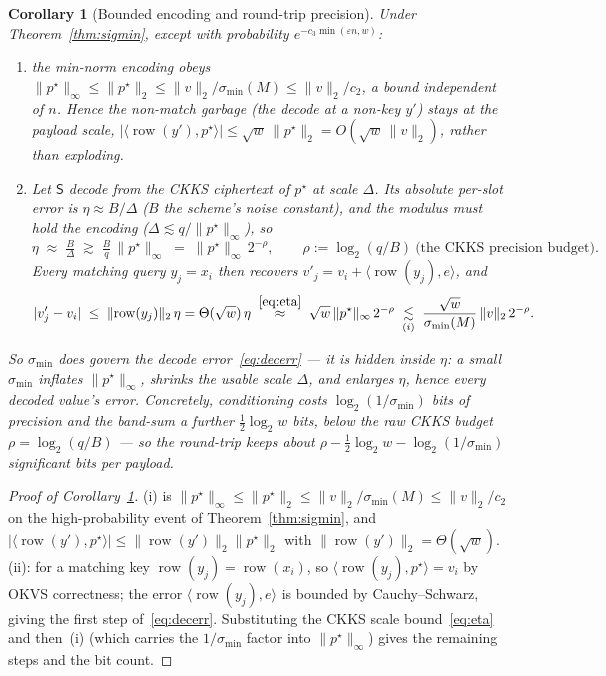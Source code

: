 \documentclass[11pt]{article}
\newcommand{\Snd}{\mathsf{S}}
\newcommand{\norm}[1]{\lVert #1 \rVert}
\newcommand{\sigmin}{\sigma_{\min}}
\DeclareMathOperator{\row}{row}
\theoremstyle{plain}
\newtheorem{corollary}{Corollary}
\theoremstyle{definition}
\begin{document}
\begin{corollary}[Bounded encoding and round-trip precision]\label{cor:precision}
Under Theorem~\ref{thm:sigmin}, except with probability $e^{-c_3\min(\varepsilon n,w)}$:
\begin{enumerate}[label=(\roman*),leftmargin=*,topsep=2pt]
  \item the min-norm encoding obeys
  $\norm{p^\star}_\infty\le\norm{p^\star}_2\le \norm{v}_2/\sigmin(M)\le\norm{v}_2/c_2$, a bound
  independent of $n$. Hence the non-match \emph{garbage} (the decode at a non-key $y'$) stays at
  the payload scale, $|\langle\row(y'),p^\star\rangle|\le\sqrt w\,\norm{p^\star}_2=O(\sqrt w\,\norm v_2)$,
  rather than exploding.
  \item Let $\Snd$ decode from the CKKS ciphertext of $p^\star$ at scale $\Delta$. Its absolute
  per-slot error is $\eta\approx B/\Delta$ ($B$ the scheme's noise constant), and the modulus
  must hold the encoding ($\Delta\lesssim q/\norm{p^\star}_\infty$), so
  \begin{equation}\label{eq:eta}
     \eta\;\approx\;\tfrac{B}{\Delta}\;\gtrsim\;\tfrac{B}{q}\,\norm{p^\star}_\infty
        \;=\;\norm{p^\star}_\infty\,2^{-\rho},\qquad \rho:=\log_2(q/B)\ \text{(the CKKS precision budget)} .
  \end{equation}
  Every matching query $y_j=x_i$ then recovers $v'_j=v_i+\langle\row(y_j),e\rangle$, and
  \begin{equation}\label{eq:decerr}
     |v'_j-v_i|\;\le\;\norm{\row(y_j)}_2\,\eta=\Theta(\sqrt w)\,\eta
       \;\overset{\eqref{eq:eta}}{\approx}\;\sqrt w\,\norm{p^\star}_\infty\,2^{-\rho}
       \;\underset{(i)}{\lesssim}\;\frac{\sqrt w}{\sigmin(M)}\,\norm{v}_2\,2^{-\rho} .
  \end{equation}
\end{enumerate}
So $\sigmin$ \emph{does} govern the decode error~\eqref{eq:decerr} --- it is hidden inside
$\eta$: a small $\sigmin$ inflates $\norm{p^\star}_\infty$, shrinks the usable scale $\Delta$,
and enlarges $\eta$, hence every decoded value's error. Concretely, conditioning costs
$\log_2(1/\sigmin)$ bits of precision and the band-sum a further $\tfrac12\log_2 w$ bits, below
the raw CKKS budget $\rho=\log_2(q/B)$ --- so the round-trip keeps about
$\rho-\tfrac12\log_2 w-\log_2(1/\sigmin)$ significant bits per payload.
\end{corollary}

\begin{proof}[Proof of Corollary~\ref{cor:precision}]
(i) is $\norm{p^\star}_\infty\le\norm{p^\star}_2\le\norm v_2/\sigmin(M)\le\norm v_2/c_2$ on the
high-probability event of Theorem~\ref{thm:sigmin}, and
$|\langle\row(y'),p^\star\rangle|\le\norm{\row(y')}_2\norm{p^\star}_2$ with
$\norm{\row(y')}_2=\Theta(\sqrt w)$. (ii): for a matching key $\row(y_j)=\row(x_i)$, so
$\langle\row(y_j),p^\star\rangle=v_i$ by OKVS correctness; the error $\langle\row(y_j),e\rangle$
is bounded by Cauchy--Schwarz, giving the first step of~\eqref{eq:decerr}. Substituting the
CKKS scale bound~\eqref{eq:eta} and then~(i) (which carries the $1/\sigmin$ factor into
$\norm{p^\star}_\infty$) gives the remaining steps and the bit count.
\end{proof}
\end{document}
